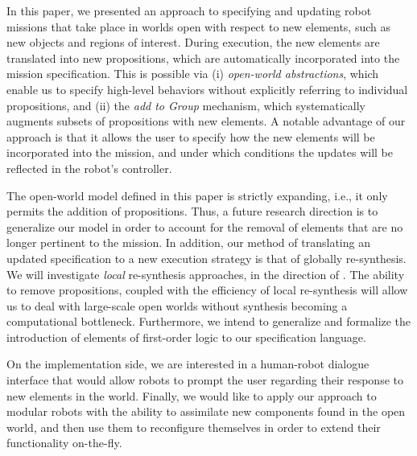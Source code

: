 In this paper, we presented an approach to specifying and updating robot missions that take place in worlds open with respect to new elements, such as new objects and regions of interest. During execution, the new elements are translated into new propositions, which are automatically incorporated into the mission specification. This is possible via (i) \emph{open-world abstractions}, which enable us to specify high-level behaviors without explicitly referring to individual propositions, and (ii) the \emph{add to Group} mechanism, which systematically augments subsets of propositions with new elements. A notable advantage of our approach is that it allows the user to specify how the new elements will be incorporated into the mission, and under which conditions the updates will be reflected in the robot's controller.

The open-world model defined in this paper is strictly expanding, i.e., it only permits the addition of propositions. Thus, a future research direction is to generalize our model in order to account for the removal of elements that are no longer pertinent to the mission. 
In addition, our method of translating an updated specification to a new execution strategy is that of globally re-synthesis. We will investigate \emph{local} re-synthesis approaches, in the direction of \cite{MurrayICRA2012, MurrayICRA2013a}.
The ability to remove propositions, coupled with the efficiency of local re-synthesis will allow us to deal with large-scale open worlds without synthesis becoming a computational bottleneck.
Furthermore, we intend to generalize and formalize the introduction of elements of first-order logic to our specification language.

On the implementation side, we are interested in a human-robot dialogue interface that would allow robots to prompt the user regarding their response to new elements in the world.
Finally, we would like to apply our approach to modular robots \cite{ModularIROS2011} with the ability to assimilate new components found in the open world, and then use them to reconfigure themselves in order to extend their functionality on-the-fly.
